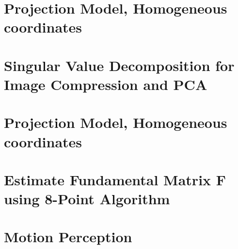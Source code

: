 










\section{Projection Model, Homogeneous coordinates}

\clearpage

\section{Singular Value Decomposition for Image Compression and PCA}

\clearpage

\section{Projection Model, Homogeneous coordinates}

\clearpage

\section{Estimate Fundamental Matrix F using 8-Point Algorithm}

\clearpage

\section{Motion Perception}

\clearpage



